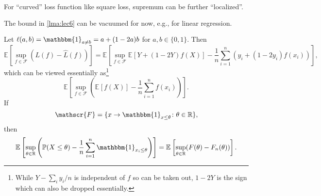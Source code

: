 \begin{remark}
	For ``curved'' loss function like square loss, supremum can be further ``localized''.
\end{remark}

\begin{remark}
	The bound in \autoref{lma:lec6} can be vacuumed for now, e.g., for linear regression.
\end{remark}

\begin{eg}
	Let \(\ell (a, b) = \mathbbm{1}_{a \neq b} = a + (1 - 2a)b\) for \(a, b\in \{ 0, 1 \} \). Then
	\[
		\mathbb{E}_{}\left[\sup _{f\in \mathscr{F} } (L(f) - \hat{L} (f)) \right]
		= \mathbb{E}_{}\left[\sup _{f\in \mathscr{F} } \mathbb{E}_{}\left[Y + (1 - 2Y)f(X) \right] - \frac{1}{n} \sum_{i=1}^{n} \left( y_i + (1 - 2y_i)f(x_i) \right) \right],
	\]
	which can be viewed essentially as\footnote{While \(Y - \sum_{i} y_i / n\) is independent of \(f\) so can be taken out, \(1 - 2Y\) is the sign which can also be dropped essentially.}
	\[
		\mathbb{E}_{}\left[\sup _{f\in \mathscr{F} } \left( \mathbb{E}_{}\left[f(X) \right] - \frac{1}{n}\sum_{i=1}^{n} f(x_i) \right)  \right].
	\]
	If
	\[
		\mathscr{F} = \{ x \to \mathbbm{1}_{x \leq \theta } \colon \theta \in \mathbb{R}  \},
	\]
	then
	\[
		\mathbb{E}_{}\left[\sup _{\theta \in \mathbb{R} } \left( \mathbb{P} (X \leq \theta ) - \frac{1}{n} \sum_{i=1}^{n} \mathbbm{1}_{x_i \leq \theta } \right) \right]
		= \mathbb{E}_{}\left[\sup _{\theta \in \mathbb{R} } (F(\theta ) - F_n(\theta )) \right] .
	\]
\end{eg}